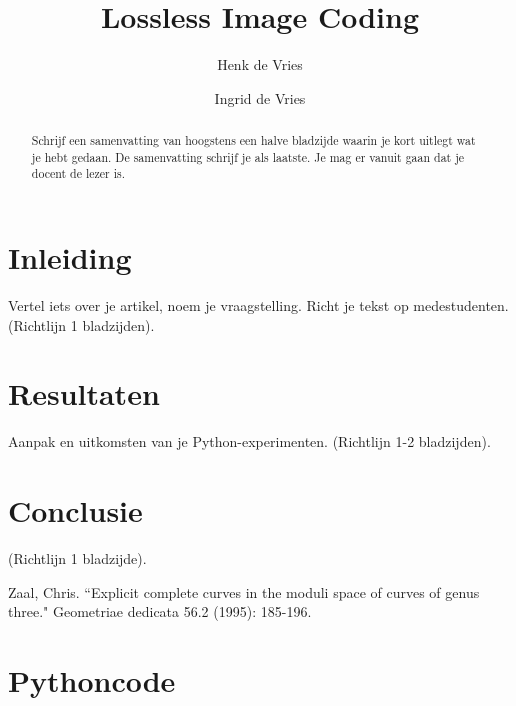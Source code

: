 \documentclass[complatex]{uvamath}
\title{Lossless Image Coding}
\author[henk@science.uva.nl, 6127901]{Henk de Vries}
\author[ingrid@science.uva.nl, 6123102]{Ingrid de Vries}
\begin{document}
\maketitle

\begin{abstract}
Schrijf een samenvatting van hoogstens een halve bladzijde waarin je kort uitlegt wat je hebt gedaan. De samenvatting schrijf je als laatste. Je mag er vanuit gaan dat je docent de lezer is.
\end{abstract}

\tableofcontents

\chapter{Inleiding}
Vertel iets over je artikel, noem je vraagstelling. Richt je tekst op medestudenten. (Richtlijn 1 bladzijden).

\chapter{Resultaten}
Aanpak en uitkomsten van je Python-experimenten. (Richtlijn 1-2 bladzijden).

\chapter{Conclusie}
(Richtlijn 1 bladzijde).

\clearpage%
\begin{thebibliography}{}
Zaal, Chris. ``Explicit complete curves in the moduli space of curves of genus three." Geometriae dedicata 56.2 (1995): 185-196.
\end{thebibliography}

\appendix

\chapter{Pythoncode}
\end{document}
